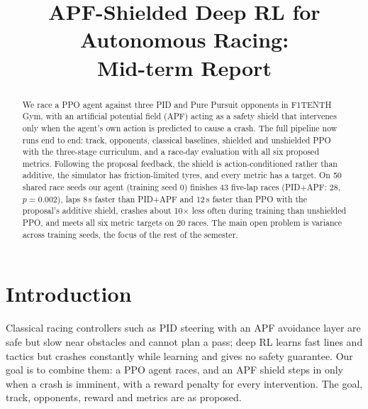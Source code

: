 \documentclass[conference]{IEEEtran}
\begin{document}
\title{APF-Shielded Deep RL for Autonomous Racing:\\Mid-term Report}

\author{
\and
{}
\and
{}
}

\maketitle

\begin{abstract}
We race a PPO agent against three PID and Pure Pursuit opponents in F1TENTH Gym, with an artificial potential
field (APF) acting as a safety shield that intervenes only when the agent's own action is predicted to cause a
crash. The full pipeline now runs end to end: track, opponents, classical baselines, shielded and unshielded PPO
with the three-stage curriculum, and a race-day evaluation with all six proposed metrics. Following the proposal
feedback, the shield is action-conditioned rather than additive, the simulator has friction-limited tyres, and
every metric has a target. On 50 shared race seeds our agent (training seed 0) finishes 43 five-lap races
(PID+APF: 28,
$p=0.002$), laps 8\,s faster than PID+APF and 12\,s faster than PPO with the proposal's additive shield,
crashes about 10$\times$ less often during training than unshielded PPO, and meets all six metric targets on 20 races. The main open problem is variance across training seeds, the focus of the rest of the semester.
\end{abstract}

\section{Introduction}
Classical racing controllers such as PID steering with an APF avoidance layer are safe but slow near obstacles and
cannot plan a pass; deep RL learns fast lines and tactics but crashes constantly while learning and gives no safety
guarantee. Our goal is to combine them: a PPO agent races, and an APF shield steps in only when a crash is
imminent, with a reward penalty for every intervention. The goal, track, opponents, reward and metrics are as
proposed.
\end{document}
